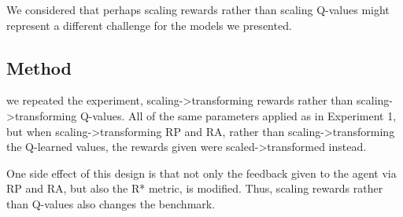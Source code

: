 
We considered that perhaps scaling rewards rather than scaling Q-values might represent a different challenge for the models we presented.

\subsection{Method}

we repeated the experiment, scaling->transforming rewards rather than scaling->transforming Q-values. All of the same parameters applied as in Experiment 1, but when scaling->transforming RP and RA, rather than scaling->transforming the Q-learned values, the rewards given were scaled->transformed instead.

One side effect of this design is that not only the feedback given to the agent via RP and RA, but also the R* metric, is modified. Thus, scaling rewards rather than Q-values also changes the benchmark.